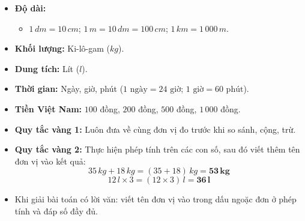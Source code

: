 \documentclass[10pt,a4paper]{article}
\begin{document}
\noindent
\begin{minipage}[t]{0.49\textwidth}\vspace{0pt}
\begin{tcolorbox}[
  enhanced,
  colback=violet!4!white,
  colframe=violet!75!black,
  arc=2mm, boxrule=0.8pt,
  left=2mm, right=2mm, top=1.8mm, bottom=1.8mm,
  title={\footnotesize\bfseries\color{white}\faKey\ 1. Bảng tổng hợp các đại lượng đã học}
]
{\footnotesize
\begin{itemize}\setlength{\itemsep}{1pt}\setlength{\leftskip}{-2.5mm}
  \item \textbf{Độ dài:}
  \begin{itemize}\setlength{\itemsep}{0.5pt}\setlength{\leftskip}{-2mm}
    \item $1\,dm = 10\,cm$; $1\,m = 10\,dm = 100\,cm$; $1\,km = 1\,000\,m$.
  \end{itemize}
  \item \textbf{Khối lượng:} Ki-lô-gam ($kg$).
  \item \textbf{Dung tích:} Lít ($l$).
  \item \textbf{Thời gian:} Ngày, giờ, phút ($1\text{ ngày} = 24\text{ giờ}$; $1\text{ giờ} = 60\text{ phút}$).
  \item \textbf{Tiền Việt Nam:} $100$ đồng, $200$ đồng, $500$ đồng, $1\,000$ đồng.
\end{itemize}
}
\end{tcolorbox}
\end{minipage}
\hfill
\begin{minipage}[t]{0.49\textwidth}\vspace{0pt}
\begin{tcolorbox}[
  enhanced,
  colback=teal!4!white,
  colframe=teal!75!black,
  arc=2mm, boxrule=0.8pt,
  left=2mm, right=2mm, top=1.8mm, bottom=1.8mm,
  title={\footnotesize\bfseries\color{white}\faSliders\ 2. Kĩ năng giải toán có kèm đại lượng}
]
{\footnotesize
\begin{itemize}\setlength{\itemsep}{1pt}\setlength{\leftskip}{-2.5mm}
  \item \textbf{Quy tắc vàng 1:} Luôn đưa về cùng đơn vị đo trước khi so sánh, cộng, trừ.
  \item \textbf{Quy tắc vàng 2:} Thực hiện phép tính trên các con số, sau đó viết thêm tên đơn vị vào kết quả:
  $$35\,kg + 18\,kg = (35 + 18)\,kg = \mathbf{53\,kg}$$
  $$12\,l \times 3 = (12 \times 3)\,l = \mathbf{36\,l}$$
  \item Khi giải bài toán có lời văn: viết tên đơn vị vào trong dấu ngoặc đơn ở phép tính và đáp số đầy đủ.
\end{itemize}
}
\end{tcolorbox}
\end{minipage}
\end{document}
